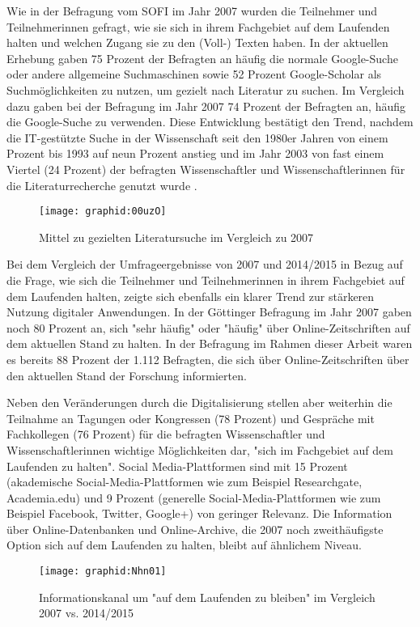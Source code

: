 Wie in der Befragung vom SOFI im Jahr 2007 wurden die Teilnehmer und Teilnehmerinnen gefragt, wie sie sich in ihrem Fachgebiet auf dem Laufenden halten und welchen Zugang sie zu den (Voll-) Texten haben. In der aktuellen Erhebung gaben 75 Prozent der Befragten an häufig die normale Google-Suche oder andere allgemeine Suchmaschinen sowie 52 Prozent Google-Scholar als Suchmöglichkeiten zu nutzen, um gezielt nach Literatur zu suchen. Im Vergleich dazu gaben bei der Befragung im Jahr 2007 74 Prozent der Befragten an, häufig die Google-Suche zu verwenden. Diese Entwicklung bestätigt den Trend, nachdem die IT-gestützte Suche in der Wissenschaft seit den 1980er Jahren von einem Prozent bis 1993 auf neun Prozent anstieg und im Jahr 2003 von fast einem Viertel (24 Prozent) der befragten Wissenschaftler und Wissenschaftlerinnen für die Literaturrecherche genutzt wurde \cite{Hanekop_2008}.

\begin{figure}[h!]
\texttt{[image: graphid:00uzO]}
\caption{Mittel zu gezielten Literatursuche im Vergleich zu 2007}
\end{figure}

Bei dem Vergleich der Umfrageergebnisse von 2007 und 2014/2015 in Bezug auf die Frage, wie sich die Teilnehmer und Teilnehmerinnen in ihrem Fachgebiet auf dem Laufenden halten, zeigte sich ebenfalls ein klarer Trend zur stärkeren Nutzung digitaler Anwendungen. In der Göttinger Befragung im Jahr 2007 gaben noch 80 Prozent an, sich "sehr häufig" oder "häufig" über Online-Zeitschriften auf dem aktuellen Stand zu halten. In der Befragung im Rahmen dieser Arbeit waren es bereits 88 Prozent der 1.112 Befragten, die sich über Online-Zeitschriften über den aktuellen Stand der Forschung informierten.

Neben den Veränderungen durch die Digitalisierung stellen aber weiterhin die Teilnahme an Tagungen oder Kongressen (78 Prozent) und Gespräche mit Fachkollegen (76 Prozent) für die befragten Wissenschaftler und Wissenschaftlerinnen wichtige Möglichkeiten dar, "sich im Fachgebiet auf dem Laufenden zu halten". Social Media-Plattformen sind mit 15 Prozent (akademische Social-Media-Plattformen wie zum Beispiel Researchgate, Academia.edu) und  9 Prozent (generelle Social-Media-Plattformen wie zum Beispiel Facebook, Twitter, Google+) von geringer Relevanz. Die Information über Online-Datenbanken und Online-Archive, die 2007 noch zweithäufigste Option sich auf dem Laufenden zu halten, bleibt auf ähnlichem Niveau.

\begin{figure}[h!]
\texttt{[image: graphid:Nhn01]}
\caption{Informationskanal um "auf dem Laufenden zu bleiben" im Vergleich 2007 vs. 2014/2015}
\end{figure}

